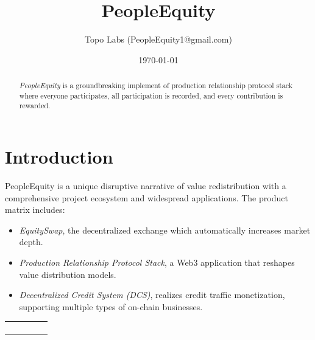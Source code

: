 \documentclass{article}
\title{PeopleEquity}
\author{Topo Labs (PeopleEquity1@gmail.com)}
\date{\today}
\begin{document}
\maketitle

\begin{abstract}

\emph{PeopleEquity} is a groundbreaking implement of production relationship protocol stack where everyone participates, all participation is recorded, and every contribution is rewarded.

\end{abstract}

\section{Introduction}
PeopleEquity is a unique disruptive narrative of value redistribution with a comprehensive project ecosystem and widespread applications. The product matrix includes: 

\begin{itemize}
   \item \emph{EquitySwap}, the decentralized exchange which automatically increases market depth.
   \item \emph{Production Relationship Protocol Stack}, a Web3 application that reshapes value distribution models.
   \item \emph{Decentralized Credit System (DCS)}, realizes credit traffic monetization, supporting multiple types of on-chain businesses. 
\end{itemize}

\begin{table}[]
\begin{tabular}{lllll}
 &  &  &  &  \\
 &  &  &  &  \\
 &  &  &  &  \\
 &  &  &  & 
\end{tabular}
\end{table}
\end{document}
